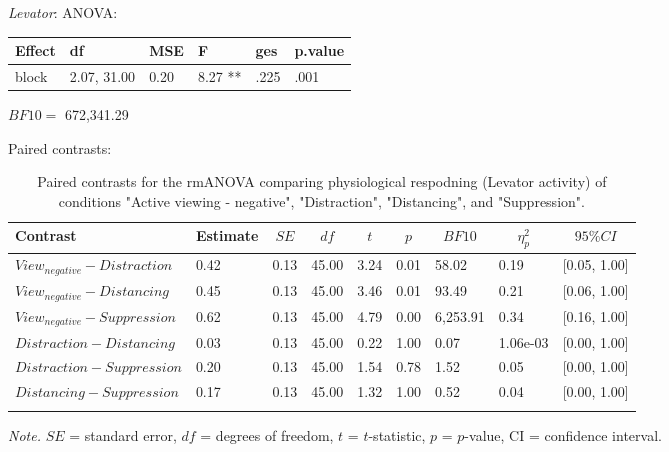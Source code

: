 \documentclass[
  english,
  man,floatsintext]{apa6}
\begin{document}
\emph{Levator}:
ANOVA:

\begin{tabular}{l|l|l|l|l|l}
\hline
Effect & df & MSE & F & ges & p.value\\
\hline
block & 2.07, 31.00 & 0.20 & 8.27 ** & .225 & .001\\
\hline
\end{tabular}

\(BF10=\) 672,341.29

Paired contrasts:

\begin{table}[H]

\begin{center}
\begin{threeparttable}

\caption{\label{tab:unnamed-chunk-8}Paired contrasts for the rmANOVA comparing physiological respodning (Levator activity) of conditions "Active viewing - negative", "Distraction", "Distancing", and "Suppression".}

\begin{tabular}{lllllllll}
\toprule
Contrast & \multicolumn{1}{c}{Estimate} & \multicolumn{1}{c}{$SE$} & \multicolumn{1}{c}{$df$} & \multicolumn{1}{c}{$t$} & \multicolumn{1}{c}{$p$} & \multicolumn{1}{c}{$BF10$} & \multicolumn{1}{c}{$\eta_{p}^{2}$} & \multicolumn{1}{c}{$95\% CI$}\\
\midrule
$View_{negative} - Distraction$ & 0.42 & 0.13 & 45.00 & 3.24 & 0.01 & 58.02 & 0.19 & {}[0.05, 1.00]\\
$View_{negative} - Distancing$ & 0.45 & 0.13 & 45.00 & 3.46 & 0.01 & 93.49 & 0.21 & {}[0.06, 1.00]\\
$View_{negative} - Suppression$ & 0.62 & 0.13 & 45.00 & 4.79 & 0.00 & 6,253.91 & 0.34 & {}[0.16, 1.00]\\
$Distraction - Distancing$ & 0.03 & 0.13 & 45.00 & 0.22 & 1.00 & 0.07 & 1.06e-03 & {}[0.00, 1.00]\\
$Distraction - Suppression$ & 0.20 & 0.13 & 45.00 & 1.54 & 0.78 & 1.52 & 0.05 & {}[0.00, 1.00]\\
$Distancing - Suppression$ & 0.17 & 0.13 & 45.00 & 1.32 & 1.00 & 0.52 & 0.04 & {}[0.00, 1.00]\\
\bottomrule
\addlinespace
\end{tabular}

\begin{tablenotes}[para]
\normalsize{\textit{Note.} $SE$ = standard error, $df$ = degrees of freedom, $t$ = $t$-statistic, $p$ = $p$-value, CI = confidence interval.}
\end{tablenotes}

\end{threeparttable}
\end{center}

\end{table}
\end{document}
